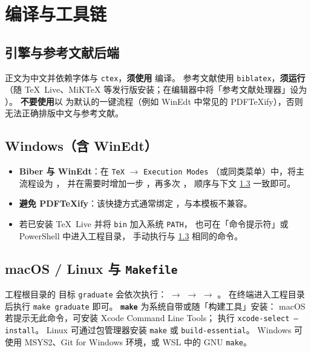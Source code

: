\section{编译与工具链}\label{sec:doctor-compile}
\subsection{引擎与参考文献后端}
\begingroup\sloppy
正文为中文并依赖字体与 \texttt{ctex}，\textbf{须使用 } 编译。
参考文献使用 \texttt{biblatex}，\textbf{须运行 }（随 TeX~Live、MiKTeX 等发行版安装；在编辑器中将「参考文献处理器」设为 ）。
\textbf{不要使用}以  为默认的一键流程（例如 WinEdt 中常见的 PDF\TeX{}ify），否则无法正确排版中文与参考文献。
\par\endgroup

\subsection{Windows（含 WinEdt）}
\begin{itemize}
  \item \textbf{Biber 与 WinEdt}：在 \texttt{TeX} $\rightarrow$ \texttt{Execution Modes}%
    （或同类菜单）中，将主流程设为 \textbf{}，%
    并在需要时增加一步 ，再多次 ，%
    顺序与下文 \cref{sec:doctor-compile-make} 一致即可。
  \item \textbf{避免 PDF\TeX{}ify}：该快捷方式通常绑定 ，与本模板不兼容。
  \item 若已安装 TeX~Live 并将 \texttt{bin} 加入系统 \texttt{PATH}，%
    也可在「命令提示符」或 PowerShell 中进入工程目录，%
    手动执行与 \cref{sec:doctor-compile-make} 相同的命令。
\end{itemize}

\subsection{macOS / Linux 与 \texttt{Makefile}}\label{sec:doctor-compile-make}
工程根目录的  目标 \texttt{graduate} 会依次执行：
 $\rightarrow$  $\rightarrow$ %
  $\rightarrow$ 。
在终端进入工程目录后执行 \texttt{make graduate} 即可。%
\textbf{\texttt{make}} 为系统自带或随「构建工具」安装：%
macOS 若提示无此命令，可安装 Xcode Command Line Tools；%
执行 \texttt{xcode-select --install}。%
Linux 可通过包管理器安装 \texttt{make} 或 \texttt{build-essential}。%
Windows 可使用 MSYS2、Git for Windows 环境，或 WSL 中的 GNU \texttt{make}。%

